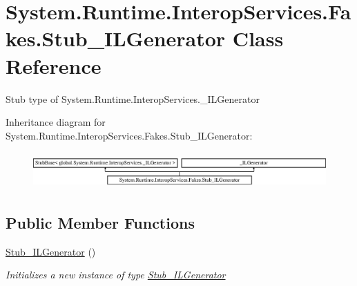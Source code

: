 \hypertarget{class_system_1_1_runtime_1_1_interop_services_1_1_fakes_1_1_stub___i_l_generator}{\section{System.\-Runtime.\-Interop\-Services.\-Fakes.\-Stub\-\_\-\-I\-L\-Generator Class Reference}
\label{class_system_1_1_runtime_1_1_interop_services_1_1_fakes_1_1_stub___i_l_generator}
}


Stub type of System.\-Runtime.\-Interop\-Services.\-\_\-\-I\-L\-Generator 


Inheritance diagram for System.\-Runtime.\-Interop\-Services.\-Fakes.\-Stub\-\_\-\-I\-L\-Generator\-:\begin{figure}[H]
\begin{center}
\leavevmode
\includegraphics[height=1.421320cm]{class_system_1_1_runtime_1_1_interop_services_1_1_fakes_1_1_stub___i_l_generator}
\end{center}
\end{figure}
\subsection*{Public Member Functions}
\begin{DoxyCompactItemize}
\item 
\hyperlink{class_system_1_1_runtime_1_1_interop_services_1_1_fakes_1_1_stub___i_l_generator_a54f8828ad8eed4224f21a0ea0af8fc73}{Stub\-\_\-\-I\-L\-Generator} ()
\begin{DoxyCompactList}\small\item\em Initializes a new instance of type \hyperlink{class_system_1_1_runtime_1_1_interop_services_1_1_fakes_1_1_stub___i_l_generator}{Stub\-\_\-\-I\-L\-Generator}\end{DoxyCompactList}\end{DoxyCompactItemize}
